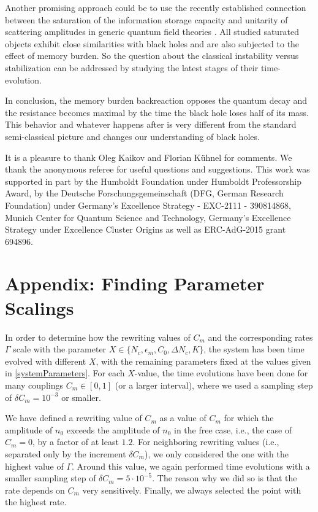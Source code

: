 \documentclass[aps,prd,reprint,superscriptaddress,nofootinbib]{revtex4-2}
\newcommand*{\ie}{i.e., }
\begin{document}
 Another promising approach could be to use the recently established 
 connection between the saturation of the information storage capacity 
 and unitarity of scattering amplitudes in generic quantum field theories 
\cite{1906.03530, 1907.07332, 2003.05546}.  All studied saturated objects 
exhibit close similarities with 
 black holes and are also subjected to the effect of memory burden. 
 So the question about the classical instability versus stabilization 
 can be addressed by studying the latest stages of their time-evolution.  
 
 

 In conclusion, the memory burden backreaction 
opposes the quantum decay and the resistance 
becomes maximal by the time the black hole loses half of its mass. 
This behavior and whatever happens after is very different from the standard semi-classical picture and changes our understanding 
of black holes.  



\begin{acknowledgments}
It is a pleasure to thank Oleg Kaikov and Florian K\"uhnel for comments. We thank the anonymous referee for useful questions and suggestions.  This work was supported in part by the Humboldt Foundation under Humboldt Professorship Award, by the Deutsche Forschungsgemeinschaft (DFG, German Research Foundation) under Germany's Excellence Strategy - EXC-2111 - 390814868, Munich Center for Quantum Science and Technology, 
 Germany's Excellence Strategy  under Excellence Cluster Origins as well as ERC-AdG-2015 grant 694896.
 

\end{acknowledgments}


\section*{Appendix: Finding Parameter Scalings}\label{sec:app}

In order to determine how the rewriting values of $C_m$ and the corresponding rates $\Gamma$ scale with the parameter $X \in \lbrace N_c, \epsilon_m, C_0, \Delta N_c, K\rbrace$, the system has been time evolved with different $X$, with the remaining parameters fixed at the values given in \eqref{systemParameters}. For each $X$-value, the time evolutions have been 
done for many couplings $C_m \in [0,1]$ (or a larger interval), where we used a sampling step of $\delta C_m = 10^{-3}$ or smaller. 


We have defined a rewriting value of $C_m$ as a value of $C_m$ for which the amplitude of $n_0$ exceeds the amplitude of $n_0$ in the free case, \ie the case of $C_m = 0$, by a factor of at least $1.2$.
For neighboring rewriting values (i.e., separated only by the increment $\delta C_m$), we only considered the one with the highest value of $\Gamma$. Around this value, we again performed time evolutions with a smaller sampling step of $\delta C_m = 5\cdot10^{-5}$. The reason why we did so 
is that the rate depends on $C_m$ very sensitively. Finally, we always selected the point with the highest rate.
\end{document}
